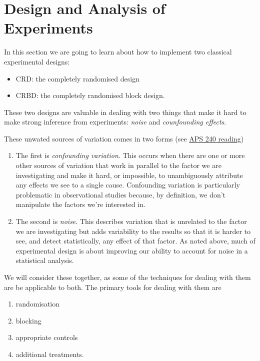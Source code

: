 \documentclass[
]{book}
\providecommand{\tightlist}{%
  \setlength{\itemsep}{0pt}\setlength{\parskip}{0pt}}
\begin{document}
\chapter{Design and Analysis of Experiments}\label{design-and-analysis-of-experiments}

In this section we are going to learn about how to implement two classical experimental designs:

\begin{itemize}
\tightlist
\item
  CRD: the completely randomised design
\item
  CRBD: the completely randomised block design.
\end{itemize}

These two designs are valuable in dealing with two things that make it hard to make strong inference from experiments: \emph{noise} and \emph{counfounding effects}.

These unwated sources of variation comes in two forms (see \href{https://dzchilds.github.io/stats-for-bio/principles-experimental-design.html\#confounded-and-noisy-experiments}{APS 240 reading})

\begin{enumerate}
\def\labelenumi{\arabic{enumi}.}
\item
  The first is \emph{confounding variation}. This occurs when there are one or more other sources of variation that work in parallel to the factor we are investigating and make it hard, or impossible, to unambiguously attribute any effects we see to a single cause. Confounding variation is particularly problematic in observational studies because, by definition, we don't manipulate the factors we're interested in.
\item
  The second is \emph{noise}. This describes variation that is unrelated to the factor we are investigating but adds variability to the results so that it is harder to see, and detect statistically, any effect of that factor. As noted above, much of experimental design is about improving our ability to account for noise in a statistical analysis.
\end{enumerate}

We will consider these together, as some of the techniques for dealing with them are be applicable to both. The primary tools for dealing with them are

\begin{enumerate}
\def\labelenumi{\arabic{enumi}.}
\tightlist
\item
  randomisation
\item
  blocking
\item
  appropriate controls
\item
  additional treatments.
\end{enumerate}
\end{document}
